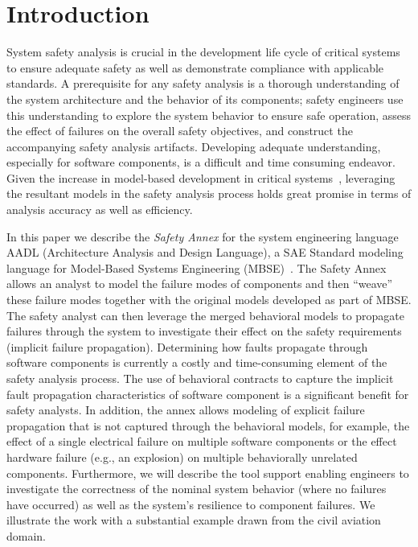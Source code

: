 \section{Introduction}
\label{sec:intro}

System safety analysis is crucial in the development life cycle of critical systems to ensure adequate safety as well as demonstrate compliance with applicable standards. A prerequisite for any safety analysis is a thorough understanding of the system architecture and the behavior of its components; safety engineers use this understanding to explore the system behavior to ensure safe operation, assess the effect of failures on the overall safety objectives, and construct the accompanying safety analysis artifacts. Developing adequate understanding, especially for software components, is a difficult and time consuming endeavor. Given the increase in model-based development in critical systems~\cite{Joshi05:Dasc,CAV2015:BoCiGrMa,info17:HaLuHo,5979344,Gudemann:2010:FQQ:1909626.1909813}, leveraging the resultant models in the safety analysis process holds great promise in terms of analysis accuracy as well as efficiency.

In this paper we describe the \emph{Safety Annex} for the system engineering language AADL (Architecture Analysis and Design Language), a SAE Standard modeling language for Model-Based Systems Engineering (MBSE)~\cite{AADL_Standard}. The Safety Annex allows an analyst to model the failure modes of components and then ``weave'' these failure modes together with the original models developed as part of MBSE. The safety analyst can then leverage the merged behavioral models to propagate failures through the system to investigate their effect on the safety requirements (implicit failure propagation). Determining how faults propagate through software components is currently a costly and time-consuming element of the safety analysis process.  The use of behavioral contracts to capture the implicit fault propagation characteristics of software component is a significant benefit for safety analysts.  
In addition, the annex allows modeling of explicit failure propagation that is not captured through the behavioral models, for example, the effect of a single electrical failure on multiple software components or the effect hardware failure (e.g., an explosion) on multiple behaviorally unrelated components. Furthermore, we will describe the tool support enabling engineers to investigate the correctness of the nominal system behavior (where no failures have occurred) as well as the system's resilience to component failures. We illustrate the work with a substantial example drawn from the civil aviation domain.

